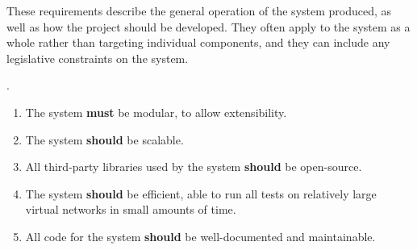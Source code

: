 
These requirements describe the general operation of the system produced, as well as how the project should be developed. They often apply to the system as a whole rather than targeting individual components, and they can include any legislative constraints on the system.

\cite{software_engineering_req_analysis}.

\begin{enumerate}[label=\textbf{NF\arabic*:}]
    \item The system \textbf{must} be modular, to allow extensibility.
    \item The system \textbf{should} be scalable.
    \item All third-party libraries used by the system \textbf{should} be open-source.
    \item The system \textbf{should} be efficient, able to run all tests on relatively large virtual networks in small amounts of time.
    \item All code for the system \textbf{should} be well-documented and maintainable.
\end{enumerate}

